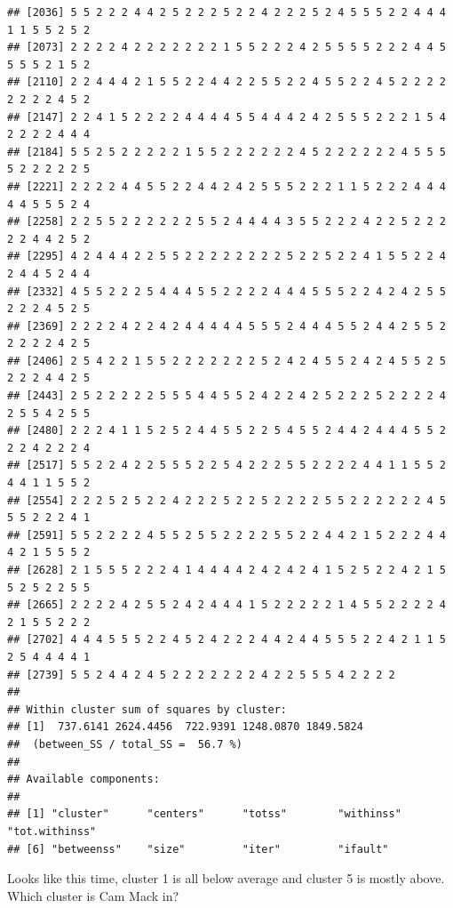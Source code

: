 \documentclass[
]{book}
\newenvironment{Shaded}{\begin{snugshade}}{\end{snugshade}}
\newcommand{\KeywordTok}[1]{\textcolor[rgb]{0.13,0.29,0.53}{\textbf{#1}}}
\newcommand{\NormalTok}[1]{#1}
\newcommand{\OperatorTok}[1]{\textcolor[rgb]{0.81,0.36,0.00}{\textbf{#1}}}
\newcommand{\StringTok}[1]{\textcolor[rgb]{0.31,0.60,0.02}{#1}}
\begin{document}
\begin{verbatim}
## [2036] 5 5 2 2 2 4 4 2 5 2 2 2 5 2 2 4 2 2 2 5 2 4 5 5 5 2 2 4 4 4 1 1 5 5 2 5 2
## [2073] 2 2 2 2 4 2 2 2 2 2 2 2 1 5 5 2 2 2 4 2 5 5 5 5 2 2 2 4 4 5 5 5 5 2 1 5 2
## [2110] 2 2 4 4 4 2 1 5 5 2 2 4 4 2 2 5 5 2 2 4 5 5 2 2 4 5 2 2 2 2 2 2 2 2 4 5 2
## [2147] 2 2 4 1 5 2 2 2 2 4 4 4 4 5 5 4 4 4 2 4 2 5 5 5 2 2 2 1 5 4 2 2 2 2 4 4 4
## [2184] 5 5 2 5 2 2 2 2 2 1 5 5 2 2 2 2 2 2 4 5 2 2 2 2 2 2 4 5 5 5 5 2 2 2 2 2 5
## [2221] 2 2 2 2 4 4 5 5 2 2 4 4 2 4 2 5 5 5 2 2 2 1 1 5 2 2 2 4 4 4 4 4 5 5 5 2 4
## [2258] 2 2 5 5 2 2 2 2 2 2 5 5 2 4 4 4 4 3 5 5 2 2 2 4 2 2 5 2 2 2 2 2 4 4 2 5 2
## [2295] 4 2 4 4 4 2 2 5 5 2 2 2 2 2 2 2 2 5 2 2 5 2 2 4 1 5 5 2 2 4 2 4 4 5 2 4 4
## [2332] 4 5 5 2 2 2 5 4 4 4 5 5 2 2 2 2 4 4 4 5 5 5 2 2 4 2 4 2 5 5 2 2 2 4 5 2 5
## [2369] 2 2 2 2 4 2 2 4 2 4 4 4 4 4 5 5 5 2 4 4 4 5 5 2 4 4 2 5 5 2 2 2 2 2 4 2 5
## [2406] 2 5 4 2 2 1 5 5 2 2 2 2 2 2 2 5 2 4 2 4 5 5 2 4 2 4 5 5 2 5 2 2 2 4 4 2 5
## [2443] 2 5 2 2 2 2 2 5 5 5 4 4 5 5 2 4 2 2 4 2 5 2 2 2 5 2 2 2 2 4 2 5 5 4 2 5 5
## [2480] 2 2 2 4 1 1 5 2 5 2 4 4 5 5 2 2 5 4 5 5 2 4 4 2 4 4 4 5 5 2 2 2 4 2 2 2 4
## [2517] 5 5 2 2 4 2 2 5 5 5 2 2 5 4 2 2 2 5 5 2 2 2 2 4 4 1 1 5 5 2 4 4 1 1 5 5 2
## [2554] 2 2 2 5 2 5 2 2 4 2 2 2 5 2 2 5 2 2 2 2 5 5 2 2 2 2 2 2 4 5 5 5 2 2 2 4 1
## [2591] 5 5 2 2 2 2 4 5 5 2 5 5 2 2 2 2 5 5 2 2 4 4 2 1 5 2 2 2 4 4 4 2 1 5 5 5 2
## [2628] 2 1 5 5 5 2 2 2 4 1 4 4 4 4 2 4 2 4 2 4 1 5 2 5 2 2 4 2 1 5 5 2 5 2 2 5 5
## [2665] 2 2 2 2 4 2 5 5 2 4 2 4 4 4 1 5 2 2 2 2 2 1 4 5 5 2 2 2 2 4 2 1 5 5 2 2 2
## [2702] 4 4 4 5 5 5 2 2 4 5 2 4 2 2 2 4 4 2 4 4 5 5 5 2 2 4 2 1 1 5 2 5 4 4 4 4 1
## [2739] 5 5 2 4 4 2 4 5 2 2 2 2 2 2 2 4 2 2 5 5 5 4 2 2 2 2
## 
## Within cluster sum of squares by cluster:
## [1]  737.6141 2624.4456  722.9391 1248.0870 1849.5824
##  (between_SS / total_SS =  56.7 %)
## 
## Available components:
## 
## [1] "cluster"      "centers"      "totss"        "withinss"     "tot.withinss"
## [6] "betweenss"    "size"         "iter"         "ifault"
\end{verbatim}

Looks like this time, cluster 1 is all below average and cluster 5 is mostly above. Which cluster is Cam Mack in?

\begin{Shaded}
\end{Shaded}
\end{document}

